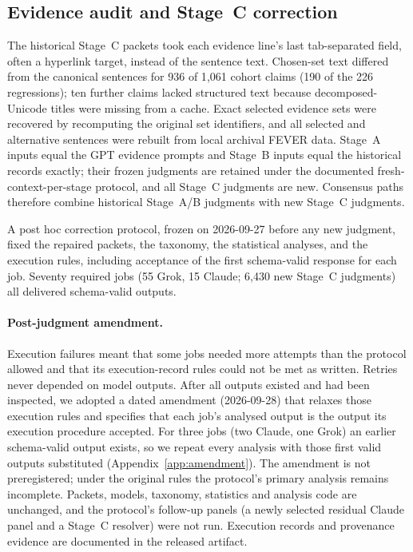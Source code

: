\subsection{Evidence audit and Stage~C correction}
\label{sec:correction}
The historical Stage~C packets took each evidence line's last tab-separated field, often a hyperlink target, instead of the sentence text.
Chosen-set text differed from the canonical sentences for 936 of 1{,}061 cohort claims (190 of the 226 regressions); ten further claims lacked structured text because decomposed-Unicode titles were missing from a cache.
Exact selected evidence sets were recovered by recomputing the original set identifiers, and all selected and alternative sentences were rebuilt from local archival FEVER data.
Stage~A inputs equal the GPT evidence prompts and Stage~B inputs equal the historical records exactly; their frozen judgments are retained under the documented fresh-context-per-stage protocol, and all Stage~C judgments are new.
Consensus paths therefore combine historical Stage~A/B judgments with new Stage~C judgments.

A post hoc correction protocol, frozen on 2026-09-27 before any new judgment, fixed the repaired packets, the taxonomy, the statistical analyses, and the execution rules, including acceptance of the first schema-valid response for each job.
Seventy required jobs (55 Grok, 15 Claude; 6{,}430 new Stage~C judgments) all delivered schema-valid outputs.

\paragraph{Post-judgment amendment.}
Execution failures meant that some jobs needed more attempts than the protocol allowed and that its execution-record rules could not be met as written.
Retries never depended on model outputs.
After all outputs existed and had been inspected, we adopted a dated amendment (2026-09-28) that relaxes those execution rules and specifies that each job's analysed output is the output its execution procedure accepted.
For three jobs (two Claude, one Grok) an earlier schema-valid output exists, so we repeat every analysis with those first valid outputs substituted (Appendix~\ref{app:amendment}).
The amendment is not preregistered; under the original rules the protocol's primary analysis remains incomplete.
Packets, models, taxonomy, statistics and analysis code are unchanged, and the protocol's follow-up panels (a newly selected residual Claude panel and a Stage~C resolver) were not run.
Execution records and provenance evidence are documented in the released artifact.

